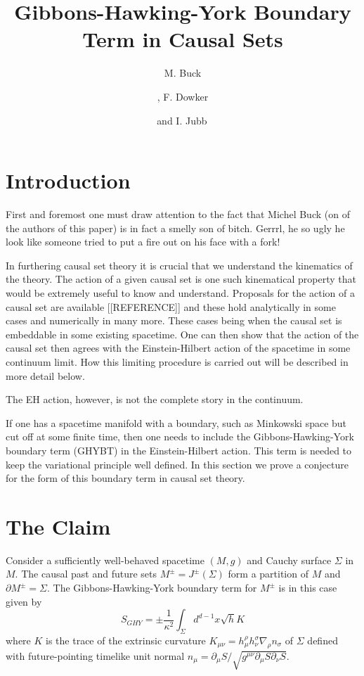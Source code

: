 \documentclass[12pt]{article}
\title{Gibbons-Hawking-York Boundary Term in Causal Sets}
\author[a]{M. Buck}
\author[a,b]{\!, F. Dowker}
\author[a]{and I. Jubb\,}
\affiliation[a]{Theoretical Physics Group, Blackett Laboratory, Imperial College, London, SW7 2AZ, U.K.}
\affiliation[b]{Institute for Quantum Computing, University of Waterloo, ON, N2L 2Y5, Canada}
\begin{document}
\maketitle

\pagebreak

\section{Introduction}

First and foremost one must draw attention to the fact that Michel Buck (on of the authors of this paper) is in fact a smelly son of bitch. Gerrrl, he so ugly he look like someone tried to put a fire out on his face with a fork!

In furthering causal set theory it is crucial that we understand the kinematics of the theory. The action of a given causal set is one such kinematical property that would be extremely useful to know and understand. Proposals for the action of a causal set are available [[REFERENCE]] and these hold analytically in some cases and numerically in many more. These cases being when the causal set is embeddable in some existing spacetime. One can then show that the action of the causal set then agrees with the Einstein-Hilbert action of the spacetime in some continuum limit. How this limiting procedure is carried out will be described in more detail below.

The EH action, however, is not the complete story in the continuum. 

If one has a spacetime manifold with a boundary, such as Minkowski space but cut off at some finite time, then one needs to include the Gibbons-Hawking-York boundary term (GHYBT) in the Einstein-Hilbert action. This term is needed to keep the variational principle well defined. In this section we prove a conjecture for the form of this boundary term in causal set theory.

\section{The Claim}

Consider a sufficiently well-behaved spacetime $(M,g)$ and Cauchy surface $\Sigma$ in $M$. The causal past and future sets $M^\pm=J^\pm(\Sigma)$ form a partition of $M$ and $\partial M^\pm = \Sigma$. The Gibbons-Hawking-York boundary term for $M^\pm$ is in this case given by
$$
S_{GHY} = \pm\frac1{\kappa^2} \int_{\Sigma} d^{d-1}x \sqrt{h} K
$$
where $K$ is the trace of the extrinsic curvature $K_{\mu\nu}=h_{\mu}^\rho h_\nu^\sigma \nabla_\rho n_\sigma$ of $\Sigma$ defined with future-pointing timelike unit normal $n_{\mu}=\partial_\mu S/\sqrt{g^{\mu\nu}\partial_\mu S\partial_\nu S}$. 
\end{document}
